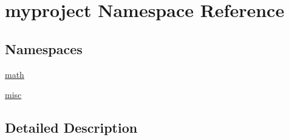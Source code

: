 \hypertarget{namespacemyproject}{}\section{myproject Namespace Reference}
\label{namespacemyproject}
\subsection*{Namespaces}
\begin{DoxyCompactItemize}
\item 
 \hyperlink{namespacemyproject_1_1math}{math}
\item 
 \hyperlink{namespacemyproject_1_1misc}{misc}
\end{DoxyCompactItemize}


\subsection{Detailed Description}
